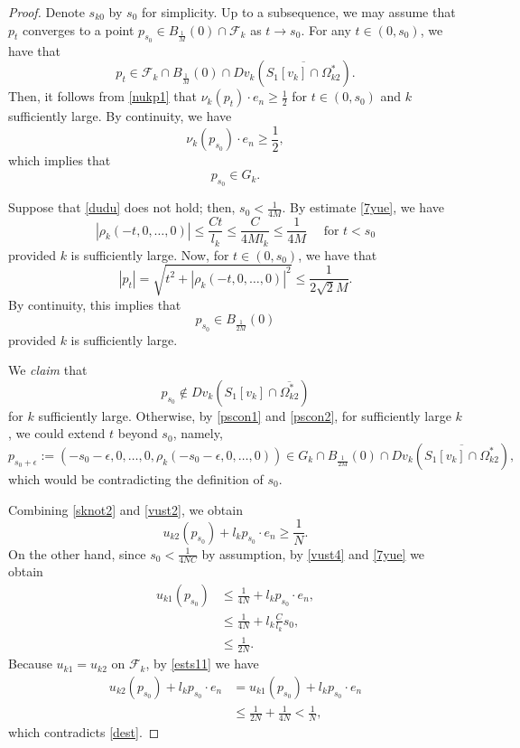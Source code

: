 \documentclass[11pt]{amsart}
\theoremstyle{plain}
\newcommand{\0}{\textbf{0}}
\numberwithin{equation}{section}
\numberwithin{equation}{section}
\numberwithin{figure}{section}
\begin{document}
\begin{proof}
Denote \( s_{k0} \) by \( s_0 \) for simplicity. Up to a subsequence, we may assume that
\( p_t \) converges to a point \( p_{s_0} \in B_{\frac{1}{M}}(0) \cap \mathcal{F}_k \) as \( t\rightarrow s_0 \).
For any \( t \in (0, s_0) \), we have that 
\[
p_{t} \in \mathcal{F}_k \cap B_{\frac{1}{M}}(0) \cap Dv_k(\overline{S_1[v_k] \cap \Omega^*_{k2}}).
\]
Then, it follows from \eqref{nukp1} that \( \nu_k(p_t) \cdot e_n \geq \frac{1}{2} \) for \( t \in (0, s_0) \) and \( k \) sufficiently large.
By continuity, we have
\[
\nu_k(p_{s_0}) \cdot e_n \geq \frac{1}{2},
\]
which implies that 
\begin{equation}\label{pscon1}
p_{s_0} \in G_k.
\end{equation}

Suppose that \eqref{dudu} does not hold; then, \( s_0 < \frac{1}{4M} \).
By estimate \eqref{7yue}, we have 
\[
|\rho_k(-t, 0, \ldots, 0)| \leq \frac{Ct}{l_k} \leq \frac{C}{4Ml_k} \leq \frac{1}{4M} \quad\text{ for } t < s_0
\] 
provided \( k \) is sufficiently large.
Now, for \( t \in (0, s_0) \), we have that 
\[
|p_t| = \sqrt{t^2 + |\rho_k(-t, 0, \ldots, 0)|^2} \leq \frac{1}{2\sqrt{2}M}.
\]
By continuity, this implies that 
\begin{equation}\label{pscon2}
p_{s_0} \in B_{\frac{1}{2M}}(0)
\end{equation}
provided \( k \) is sufficiently large.

We \emph{claim} that 
\begin{equation}\label{sknot2}
p_{s_0} \notin Dv_k\left(S_1[v_k] \cap \overline{\Omega^*_{k2}}\right)
\end{equation}
for \( k \) sufficiently large.
Otherwise, by \eqref{pscon1} and \eqref{pscon2}, for sufficiently large \( k \), we could extend \( t \) beyond \( s_0 \), namely,
\[
p_{s_0+\epsilon} := (-s_0-\epsilon, 0, \ldots, 0, \rho_k(-s_0-\epsilon, 0, \ldots, 0)) \in G_k \cap B_{\frac{1}{2M}}(0) \cap Dv_k\left(\overline{S_1[v_k] \cap \Omega^*_{k2}}\right),
\]
which would be contradicting the definition of \( s_0 \).

 
 
Combining \eqref{sknot2} and \eqref{vust2},
we obtain
\begin{equation}\label{dest}
u_{k2}(p_{s_0}) + l_kp_{s_0} \cdot e_n \geq \frac{1}{N}.
\end{equation}
On the other hand, since $s_0<\frac{1}{4NC}$ by assumption, by \eqref{vust4} and \eqref{7yue} we obtain
	\begin{align}
		u_{k1}(p_{s_0}) &\leq \frac{1}{4N} + l_kp_{s_0} \cdot e_n, \nonumber \\
			&\leq \frac{1}{4N} + l_k\frac{C}{l_k}s_0, \label{ests11} \\
			&\leq \frac{1}{2N}. \nonumber 
	\end{align}
Because \( u_{k1} = u_{k2} \) on \( \mathcal{F}_k \), by \eqref{ests11} we have
\begin{align*}
u_{k2}(p_{s_0}) + l_kp_{s_0} \cdot e_n &= u_{k1}(p_{s_0}) + l_kp_{s_0} \cdot e_n \\
&\leq \frac{1}{2N} + \frac{1}{4N} < \frac{1}{N},
\end{align*}
which contradicts \eqref{dest}.
\end{proof}
\end{document}
